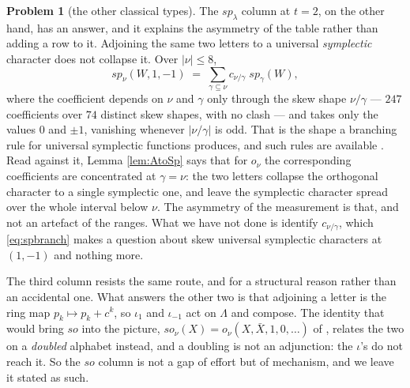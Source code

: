 \documentclass[11pt,reqno]{amsart}
\theoremstyle{plain}
\theoremstyle{definition}
\newtheorem{problem}[theorem]{Problem}
\begin{document}
\begin{problem}[the other classical types]
The $sp_\lambda$ column at $t=2$, on the other hand, has an answer, and it explains the asymmetry of
the table rather than adding a row to it. Adjoining the same two letters to a universal
\emph{symplectic} character does not collapse it. Over $|\nu|\le8$,
\begin{equation}\label{eq:spbranch}
sp_\nu(W,1,-1)\;=\;\sum_{\gamma\subseteq\nu}c_{\nu/\gamma}\;sp_\gamma(W),
\end{equation}
where the coefficient depends on $\nu$ and $\gamma$ only through the skew shape $\nu/\gamma$ ---
$247$ coefficients over $74$ distinct skew shapes, with no clash --- and takes only the values $0$
and $\pm1$, vanishing whenever $|\nu/\gamma|$ is odd. That is the shape a branching rule for
universal symplectic functions produces, and such rules are available \cite{JJLW24}. Read against it,
Lemma \ref{lem:AtoSp} says that for $o_\nu$ the corresponding coefficients are concentrated at
$\gamma=\nu$: the two letters collapse the orthogonal character to a single symplectic one, and leave
the symplectic character spread over the whole interval below $\nu$. The asymmetry of the measurement
is that, and not an artefact of the ranges. What we have not done is identify $c_{\nu/\gamma}$, which
\eqref{eq:spbranch} makes a question about skew universal symplectic characters at $(1,-1)$ and
nothing more.

The third column resists the same route, and for a structural reason rather than an accidental one.
What answers the other two is that adjoining a letter is the ring map $p_k\mapsto p_k+c^k$, so
$\iota_{1}$ and $\iota_{-1}$ act on $\Lambda$ and compose. The identity that would bring $so$ into
the picture, $so_\nu(X)=o_\nu(X,\bar X,1,0,\dots)$ of \cite[(2.13)]{AK25}, relates the two on a
\emph{doubled} alphabet instead, and a doubling is not an adjunction: the $\iota$'s do not reach it.
So the $so$ column is not a gap of effort but of mechanism, and we leave it stated as such.
\end{problem}
\end{document}
